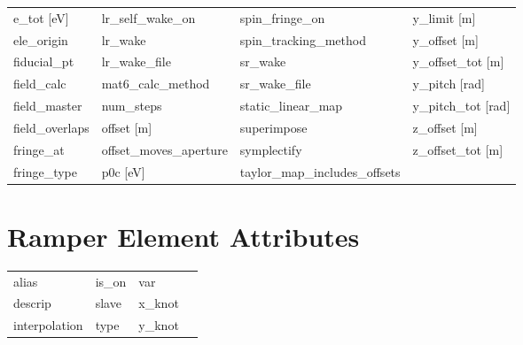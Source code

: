 \begin{tabular}{llll}
e_tot [eV]                       & lr_self_wake_on                  & spin_fringe_on                   & y_limit [m]                      \\
ele_origin                       & lr_wake                          & spin_tracking_method             & y_offset [m]                     \\
fiducial_pt                      & lr_wake_file                     & sr_wake                          & y_offset_tot [m]                 \\
field_calc                       & mat6_calc_method                 & sr_wake_file                     & y_pitch [rad]                    \\
field_master                     & num_steps                        & static_linear_map                & y_pitch_tot [rad]                \\
field_overlaps                   & offset [m]                       & superimpose                      & z_offset [m]                     \\
fringe_at                        & offset_moves_aperture            & symplectify                      & z_offset_tot [m]                 \\
fringe_type                      & p0c [eV]                         & taylor_map_includes_offsets      &                                  \\
 \bottomrule
 \end{tabular}
 \vfill
 
 \section{Ramper Element Attributes}
 \label{s:list.ramper}
 
 \begin{tabular}{llll} \toprule
alias                            & is_on                            & var                              &                                  \\
descrip                          & slave                            & x_knot                           &                                  \\
interpolation                    & type                             & y_knot                           &                                  \\
 \bottomrule
 \end{tabular}
 \vfill
 
